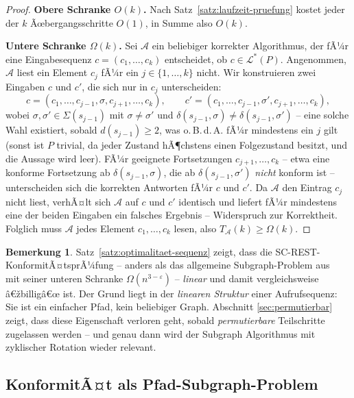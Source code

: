 ﻿\documentclass[a4paper,12pt]{article}
\theoremstyle{definition}
\newtheorem{bemerkung}{Bemerkung}
\begin{document}
\begin{proof}
	\textbf{Obere Schranke $O(k)$.} Nach Satz~\ref{satz:laufzeit-pruefung} kostet jeder
	der $k$ Ãœbergangsschritte $O(1)$, in Summe also $O(k)$.

	\textbf{Untere Schranke $\Omega(k)$.} Sei $\mathcal{A}$ ein beliebiger korrekter
	Algorithmus, der fÃ¼r eine Eingabesequenz $c=(c_1,\ldots,c_k)$ entscheidet, ob
	$c \in \mathcal{L}^*(P)$. Angenommen, $\mathcal{A}$ liest ein Element $c_j$ fÃ¼r ein
	$j\in\{1,\ldots,k\}$ nicht. Wir konstruieren zwei Eingaben $c$ und $c'$, die sich nur
	in $c_j$ unterscheiden:
	\[
		c = (c_1,\ldots,c_{j-1}, \sigma, c_{j+1},\ldots,c_k), \qquad
		c' = (c_1,\ldots,c_{j-1}, \sigma', c_{j+1},\ldots,c_k),
	\]
	wobei $\sigma, \sigma' \in \Sigma(s_{j-1})$ mit $\sigma \neq \sigma'$ und
	$\delta(s_{j-1},\sigma) \neq \delta(s_{j-1},\sigma')$ -- eine solche Wahl existiert,
	sobald $d(s_{j-1}) \ge 2$, was o.\,B.\,d.\,A. fÃ¼r mindestens ein $j$ gilt (sonst ist
	$P$ trivial, da jeder Zustand hÃ¶chstens einen Folgezustand besitzt, und die Aussage
	wird leer). FÃ¼r geeignete Fortsetzungen $c_{j+1},\ldots,c_k$ -- etwa eine konforme
	Fortsetzung ab $\delta(s_{j-1},\sigma)$, die ab $\delta(s_{j-1},\sigma')$ \emph{nicht}
	konform ist -- unterscheiden sich die korrekten Antworten fÃ¼r $c$ und $c'$. Da
	$\mathcal{A}$ den Eintrag $c_j$ nicht liest, verhÃ¤lt sich $\mathcal{A}$ auf $c$ und
	$c'$ identisch und liefert fÃ¼r mindestens eine der beiden Eingaben ein falsches
	Ergebnis -- Widerspruch zur Korrektheit. Folglich muss $\mathcal{A}$ jedes Element
	$c_1,\ldots,c_k$ lesen, also $T_{\mathcal{A}}(k) \ge \Omega(k)$. \qedhere
\end{proof}

\begin{bemerkung}
	Satz~\ref{satz:optimalitaet-sequenz} zeigt, dass die SC-REST-KonformitÃ¤tsprÃ¼fung --
	anders als das allgemeine Subgraph-Problem aus~\cite{epp2026subgraph} mit seiner
	unteren Schranke $\Omega(n^{3-\varepsilon})$ -- \emph{linear} und damit
	vergleichsweise â€žbilligâ€œ ist. Der Grund liegt in der \emph{linearen Struktur} einer
	Aufrufsequenz: Sie ist ein einfacher Pfad, kein beliebiger Graph. Abschnitt
	\ref{sec:permutierbar} zeigt, dass diese Eigenschaft verloren geht, sobald
	\emph{permutierbare} Teilschritte zugelassen werden -- und genau dann wird der
	Subgraph Algorithmus mit zyklischer Rotation wieder relevant.
\end{bemerkung}

\subsection{KonformitÃ¤t als Pfad-Subgraph-Problem}
\end{document}
